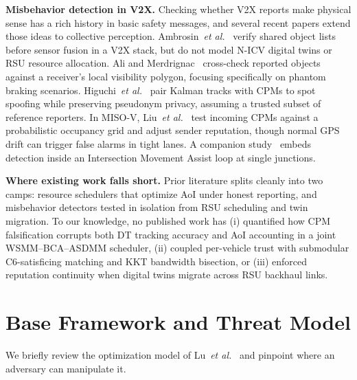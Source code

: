 \documentclass[conference]{IEEEtran}
\begin{document}
\textbf{Misbehavior detection in V2X.} Checking whether V2X reports make physical sense has a rich history in basic safety messages, and several recent papers extend those ideas to collective perception. Ambrosin~\textit{et al.}~\cite{ambrosin2020} verify shared object lists before sensor fusion in a V2X stack, but do not model N-ICV digital twins or RSU resource allocation. Ali and Merdrignac~\cite{ali2021} cross-check reported objects against a receiver's local visibility polygon, focusing specifically on phantom braking scenarios. Higuchi~\textit{et al.}~\cite{higuchi2023} pair Kalman tracks with CPMs to spot spoofing while preserving pseudonym privacy, assuming a trusted subset of reference reporters. In MISO-V, Liu~\textit{et al.}~\cite{liu2024miso} test incoming CPMs against a probabilistic occupancy grid and adjust sender reputation, though normal GPS drift can trigger false alarms in tight lanes. A companion study~\cite{liu2024ima} embeds detection inside an Intersection Movement Assist loop at single junctions.

\textbf{Where existing work falls short.} Prior literature splits cleanly into two camps: resource schedulers that optimize AoI under honest reporting, and misbehavior detectors tested in isolation from RSU scheduling and twin migration. To our knowledge, no published work has (i) quantified how CPM falsification corrupts both DT tracking accuracy and AoI accounting in a joint WSMM--BCA--ASDMM scheduler, (ii) coupled per-vehicle trust with submodular C6-satisficing matching and KKT bandwidth bisection, or (iii) enforced reputation continuity when digital twins migrate across RSU backhaul links.

\section{Base Framework and Threat Model}
We briefly review the optimization model of Lu~\textit{et al.}~\cite{lu2025} and pinpoint where an adversary can manipulate it.
\end{document}
